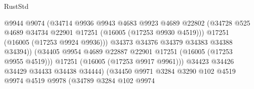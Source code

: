 \begin{lexlean}{RustStd}
\begin{coremodule}
                                            @9944
                                            @9074
                                            (@34714
                                              @9936
                                              @9943
                                              @4683
                                              @9923
                                              @4689
                                              @22802
                                              (@34728
                                                @525
                                                @4689
                                                @34734
                                                @22901
                                                @17251
                                                (@16005 (@17253 @9930 @4519)))
                                              @17251
                                              (@16005 (@17253 @9924 @9936)))
                                            @34373
                                            @34376
                                            @34379
                                            @34383
                                            @34388
                                            @34394))
                                        (@34405
                                          @9954
                                          @4689
                                          @22887
                                          @22901
                                          @17251
                                          (@16005 (@17253 @9955 @4519)))
                                        @17251
                                        (@16005 (@17253 @9917 @9961)))
                                      @34423
                                      @34426
                                      @34429
                                      @34433
                                      @34438
                                      @34444)
                                    (@34450
                                      @9971
                                      @3284
                                      @3290
                                      @102
                                      @4519
                                      @9974
                                      @4519
                                      @9978
                                      (@34789
                                        @3284
                                        @102
                                        @9974

\end{coremodule}
\end{lexlean}
